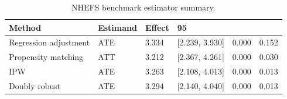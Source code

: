 \begin{table}[t!]
\centering
\footnotesize
\caption{NHEFS benchmark estimator summary.}
\label{tab:paper-nhefs_public_benchmark-estimators}
\setlength{\tabcolsep}{4.5pt}
\begin{tabular}{llllll}
\hline
Method & Estimand & Effect & 95\\%
\hline
Regression adjustment & ATE & 3.334 & [2.239, 3.930] & 0.000 & 0.152 \\
Propensity matching & ATT & 3.212 & [2.367, 4.261] & 0.000 & 0.030 \\
IPW & ATE & 3.263 & [2.108, 4.013] & 0.000 & 0.013 \\
Doubly robust & ATE & 3.294 & [2.140, 4.040] & 0.000 & 0.013 \\
\hline
\end{tabular}
\end{table}
